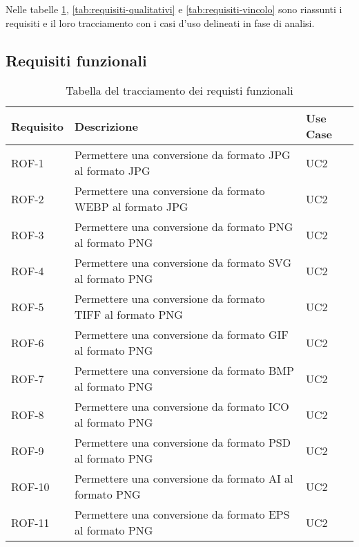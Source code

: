 Nelle tabelle \ref{tab:requisiti-funzionali}, \ref{tab:requisiti-qualitativi} e
\ref{tab:requisiti-vincolo} sono riassunti i requisiti e il loro tracciamento
con i casi d'uso delineati in fase di analisi.

\newpage

\subsection{Requisiti funzionali}
\begin{table}%
    \caption{Tabella del tracciamento dei requisti funzionali}
    \label{tab:requisiti-funzionali}
    \begin{tabularx}{\textwidth}{lXl}
        \hline\hline
        \textbf{Requisito} & \textbf{Descrizione}                                            & \textbf{Use Case} \\
        \hline
        ROF-1              & Permettere una conversione da formato JPG al
        formato JPG        & UC2
        \\
        \hline
        ROF-2              & Permettere una conversione da formato WEBP al formato JPG       & UC2
        \\
        \hline
        ROF-3              & Permettere una conversione da formato PNG al formato PNG        & UC2
        \\
        \hline
        ROF-4              & Permettere una conversione da formato SVG al formato PNG        & UC2
        \\
        \hline
        ROF-5              & Permettere una conversione da formato TIFF al formato PNG       & UC2
        \\
        \hline
        ROF-6              & Permettere una conversione da formato GIF al formato PNG        & UC2
        \\
        \hline
        ROF-7              & Permettere una conversione da formato BMP al formato PNG        & UC2
        \\
        \hline
        ROF-8              & Permettere una conversione da formato ICO al formato PNG        & UC2
        \\
        \hline
        ROF-9              & Permettere una conversione da formato PSD al formato PNG        & UC2
        \\
        \hline
        ROF-10             & Permettere una conversione da formato AI al formato PNG         & UC2
        \\
        \hline
        ROF-11             & Permettere una conversione da formato EPS al formato PNG        & UC2

\end{tabularx}
\end{table}
